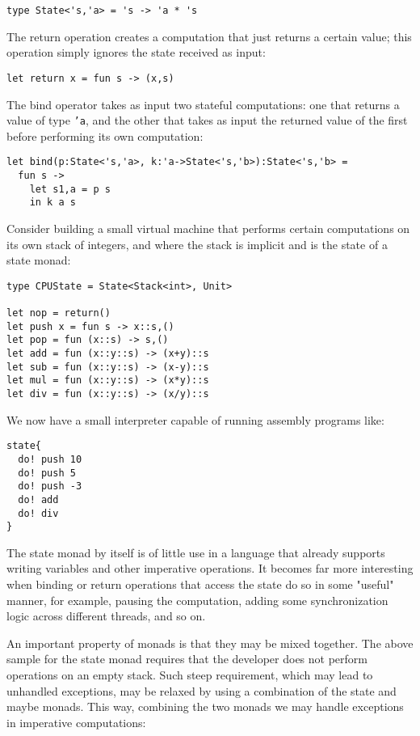 \begin{lstlisting}
type State<'s,'a> = 's -> 'a * 's
\end{lstlisting}

The return operation creates a computation that just returns a certain value; this operation simply ignores the state received as input:

\begin{lstlisting}
let return x = fun s -> (x,s)
\end{lstlisting}

The bind operator takes as input two stateful computations: one that returns a value of type \texttt{'a}, and the other that takes as input the returned value of the first before performing its own computation:

\begin{lstlisting}
let bind(p:State<'s,'a>, k:'a->State<'s,'b>):State<'s,'b> =
  fun s ->
    let s1,a = p s
    in k a s
\end{lstlisting}

Consider building a small virtual machine that performs certain computations on its own stack of integers, and where the stack is implicit and is the state of a state monad:

\begin{lstlisting}
type CPUState = State<Stack<int>, Unit>

let nop = return()
let push x = fun s -> x::s,()
let pop = fun (x::s) -> s,()
let add = fun (x::y::s) -> (x+y)::s
let sub = fun (x::y::s) -> (x-y)::s
let mul = fun (x::y::s) -> (x*y)::s
let div = fun (x::y::s) -> (x/y)::s
\end{lstlisting}

We now have a small interpreter capable of running assembly programs like:

\begin{lstlisting}
state{
  do! push 10
  do! push 5
  do! push -3
  do! add
  do! div
}
\end{lstlisting}

The state monad by itself is of little use in a language that already supports writing variables and other imperative operations. It becomes far more interesting when binding or return operations that access the state do so in some "useful" manner, for example, pausing the computation, adding some synchronization logic across different threads, and so on.

An important property of monads is that they may be mixed together. The above sample for the state monad requires that the developer does not perform operations on an empty stack. Such steep requirement, which may lead to unhandled exceptions, may be relaxed by using a combination of the state and maybe monads. This way, combining the two monads we may handle exceptions in imperative computations:

